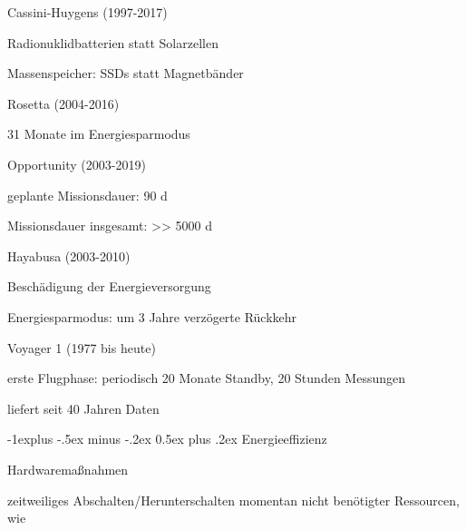 \documentclass[a4paper]{article}
\makeatletter
\renewcommand{\subsection}{\@startsection{subsection}{2}{0mm}%
 {-1explus -.5ex minus -.2ex}%
 {0.5ex plus .2ex}%
 {\normalfont\normalsize\bfseries}}
\makeatother
\begin{document}
\begin{multicols}{3}
    \begin{itemize*}
        \item
        Cassini-Huygens (1997-2017)
        \begin{itemize*}
            \item Radionuklidbatterien statt Solarzellen
            \item Massenspeicher: SSDs statt Magnetbänder
        \end{itemize*}
        \item
        Rosetta (2004-2016)
        \begin{itemize*}
            \item 31 Monate im Energiesparmodus
        \end{itemize*}
        \item
        Opportunity (2003-2019)
        \begin{itemize*}
            \item geplante Missionsdauer: 90 d
            \item Missionsdauer insgesamt: \textgreater\textgreater{} 5000 d
        \end{itemize*}
        \item
        Hayabusa (2003-2010)
        \begin{itemize*}
            \item Beschädigung der Energieversorgung
            \item Energiesparmodus: um 3 Jahre verzögerte Rückkehr
        \end{itemize*}
        \item
        Voyager 1 (1977 bis heute)
        \begin{itemize*}
            \item erste Flugphase: periodisch 20 Monate Standby, 20 Stunden Messungen
            \item liefert seit 40 Jahren Daten
        \end{itemize*}
    \end{itemize*}


    \subsection{Energieeffizienz}

    Hardwaremaßnahmen

    \begin{itemize*}
        \item
        zeitweiliges Abschalten/Herunterschalten momentan nicht benötigter
        Ressourcen, wie
    \end{itemize*}


\end{multicols}
\end{document}
